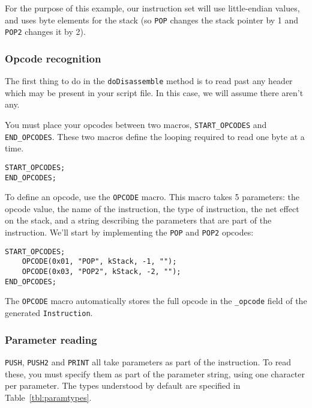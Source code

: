 For the purpose of this example, our instruction set will use little-endian values, and uses byte elements for the stack (so \verb+POP+ changes the stack pointer by 1 and \verb+POP2+ changes it by 2).

\subsubsection{Opcode recognition}
The first thing to do in the \verb+doDisassemble+ method is to read past any header which may be present in your script file. In this case, we will assume there aren't any.

You must place your opcodes between two macros, \verb+START_OPCODES+ and \verb+END_OPCODES+. These two macros define the looping required to read one byte at a time.

\begin{C++}
\begin{lstlisting}
START_OPCODES;
END_OPCODES;
\end{lstlisting}
\end{C++}

To define an opcode, use the \verb+OPCODE+ macro. This macro takes 5 parameters: the opcode value, the name of the instruction, the type of instruction, the net effect on the stack, and a string describing the parameters that are part of the instruction. We'll start by implementing the \verb+POP+ and \verb+POP2+ opcodes:

\begin{C++}
\begin{lstlisting}
START_OPCODES;
	OPCODE(0x01, "POP", kStack, -1, "");
	OPCODE(0x03, "POP2", kStack, -2, "");
END_OPCODES;
\end{lstlisting}
\end{C++}

The \verb+OPCODE+ macro automatically stores the full opcode in the \verb+_opcode+ field of the generated \verb+Instruction+.

\subsubsection{Parameter reading}
\verb+PUSH+, \verb+PUSH2+ and \verb+PRINT+ all take parameters as part of the instruction. To read these, you must specify them as part of the parameter string, using one character per parameter. The types understood by default are specified in Table~\vref{tbl:paramtypes}.


